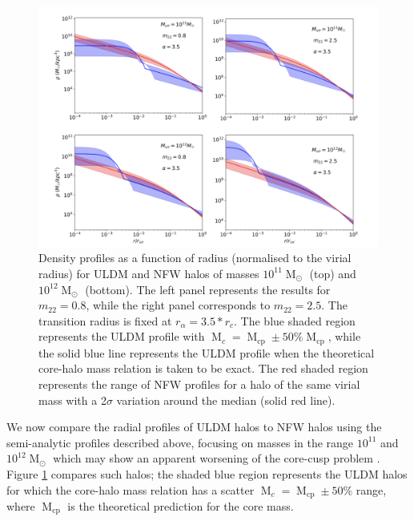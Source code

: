 \documentclass{pasa}%
\begin{document}
\begin{figure}[t]
\centering
\includegraphics[scale=0.4, trim={2cm 0cm 0cm 1cm}]{new_combined_1.png}
\caption{Density profiles as a function of radius (normalised to the virial radius) for ULDM and NFW halos of masses $10^{11}\operatorname{M}_{\odot}$ (top) and $10^{12}\operatorname{M}_{\odot}$ (bottom). The left panel represents the results for $m_{22} = 0.8$, while the right panel corresponds to $m_{22}=2.5$. The transition radius is fixed at $r_{\alpha} = 3.5*r_c$. The blue shaded region represents the ULDM profile with $\operatorname{M}_c = \operatorname{M}_{\mathrm{cp}} \pm 50 \% \operatorname{M}_{\mathrm{cp}}$, while the solid blue line represents the ULDM profile when the theoretical core-halo mass relation is taken to be exact. The red shaded region represents the range of NFW profiles for a halo of the same virial mass with a 2$\sigma$ variation around the median (solid red line).}\label{fig:profiles}
\end{figure}
 
We now compare the radial profiles of ULDM halos to NFW halos using the semi-analytic profiles described above, focusing on masses in the range $10^{11}$ and $10^{12} \operatorname{M}_{\odot}$ which may show an apparent worsening of the core-cusp problem \cite{Robles:2018fur}. Figure \ref{fig:profiles}  compares such halos; the shaded blue region represents the ULDM halos for which the core-halo mass relation has a scatter $\operatorname{M}_c = \operatorname{M}_{\mathrm{cp}} \pm 50 \% $ range, where $\operatorname{M}_{\mathrm{cp}}$ is the theoretical prediction for the core mass.
\end{document}
